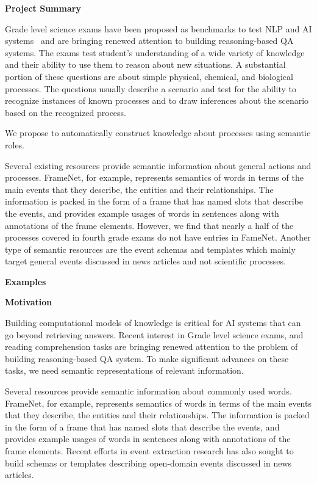 \begin{center}\textbf{Project Summary}
\end{center}

Grade level science exams have been proposed as benchmarks to test NLP and AI systems~\cite{?,?,?} and are bringing renewed attention to building reasoning-based QA systems. The exams test student's understanding of a wide variety of knowledge and their ability to use them to reason about new situations. A substantial portion of these questions are about simple physical, chemical, and biological processes. The questions usually describe a scenario and test for the ability to recognize instances of known processes and to draw inferences about the scenario based on the recognized process. 

We propose to automatically construct knowledge about processes using semantic roles.

Several existing resources provide semantic information about general actions and processes. FrameNet, for example, represents semantics of words in terms of the main events that they describe, the entities and their relationships. The information is packed in the form of a frame that has named slots that describe the events, and provides example usages of words in sentences along with annotations of the frame elements. However, we find that nearly a half of the processes covered in fourth grade exams do not have entries in FameNet. Another type of semantic resources are the event schemas and templates which mainly target general events discussed in news articles and not scientific processes. 


{\bf Examples}




{\bf Motivation}

Building computational models of knowledge is critical for AI systems that can go beyond retrieving answers. 
Recent interest in Grade level science exams, and reading comprehension tasks are bringing renewed attention to the problem of building reasoning-based QA system. 
To make significant advances on these tasks, we need semantic representations of relevant information. 

Several resources provide semantic information about commonly used words. FrameNet, for example, represents semantics of words in terms of the main events that they describe, the entities and their relationships. The information is packed in the form of a frame that has named slots that describe the events, and provides example usages of words in sentences along with annotations of the frame elements. Recent efforts in event extraction research has also sought to build schemas or templates describing open-domain events discussed in news articles. 

